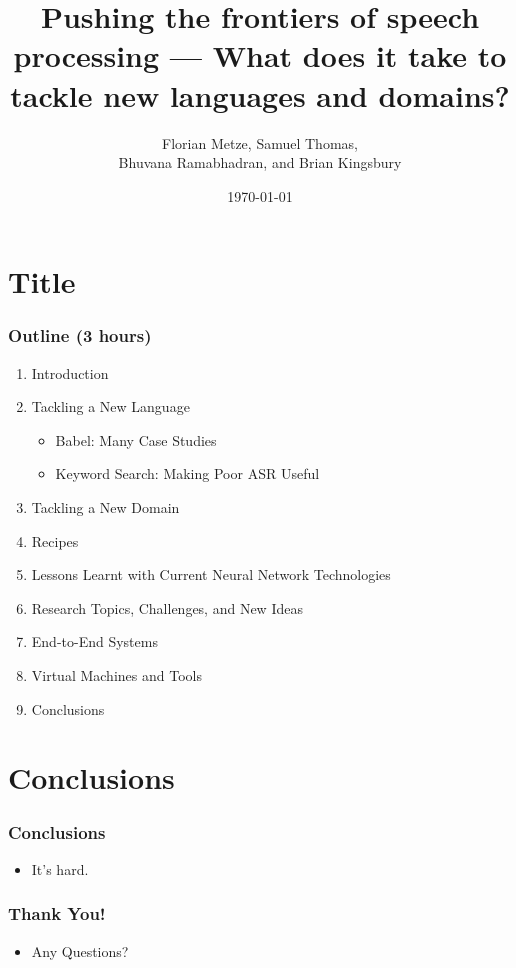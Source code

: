 \documentclass[12pt,xcolor=dvipsnames]{beamer}
\author{Florian Metze, Samuel Thomas, \\
  Bhuvana Ramabhadran, and Brian Kingsbury}
\title{{\color{Maroon} Pushing the frontiers of speech processing --- What does it take to tackle new languages and domains?}}
\institute{Carnegie Mellon University and IBM}
\date{\today}
\begin{document}
\section{Title}

\begin{frame}
  \titlepage
\end{frame}



\begin{frame}
  \frametitle{Outline (3 hours)}
  \begin{enumerate}
  \item Introduction
  \item Tackling a New Language
    \begin{itemize}
      \item Babel: Many Case Studies
      \item Keyword Search:  Making Poor ASR Useful
    \end{itemize}
  \item Tackling a New Domain
  \item Recipes
  \item Lessons Learnt with Current Neural Network Technologies
  \item Research Topics, Challenges, and New Ideas
  \item End-to-End Systems
  \item Virtual Machines and Tools
  \item Conclusions
  \end{enumerate}
\end{frame}











\section{Conclusions}

\begin{frame}
  \frametitle{Conclusions}
  \begin{itemize}
  \item It's hard.
  \end{itemize}
\end{frame}

\begin{frame}
  \frametitle{Thank You!}
  \begin{itemize}
  \item Any Questions?
  \end{itemize}
\end{frame}


\end{document}
